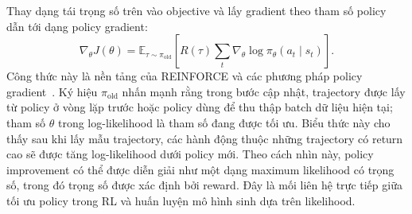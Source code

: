 Thay dạng tái trọng số trên vào objective và lấy gradient theo tham số policy dẫn tới dạng policy gradient:
\begin{equation}
    \nabla_\theta J(\theta)
    =
    \mathbb{E}_{\tau\sim\pi_{\mathrm{old}}}
    \left[
        R(\tau)
        \sum_t
        \nabla_\theta
        \log \pi_\theta(a_t\mid s_t)
    \right].
\end{equation}
Công thức này là nền tảng của REINFORCE và các phương pháp policy gradient~\citep{williams1992reinforce}.
Ký hiệu $\pi_{\mathrm{old}}$ nhấn mạnh rằng trong bước cập nhật, trajectory được lấy từ policy ở vòng lặp trước hoặc policy dùng để thu thập batch dữ liệu hiện tại; tham số $\theta$ trong log-likelihood là tham số đang được tối ưu.
Biểu thức này cho thấy sau khi lấy mẫu trajectory, các hành động thuộc những trajectory có return cao sẽ được tăng log-likelihood dưới policy mới.
Theo cách nhìn này, policy improvement có thể được diễn giải như một dạng maximum likelihood có trọng số, trong đó trọng số được xác định bởi reward.
Đây là mối liên hệ trực tiếp giữa tối ưu policy trong RL và huấn luyện mô hình sinh dựa trên likelihood.

